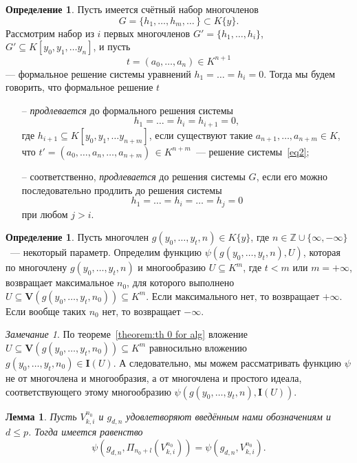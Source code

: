 \documentclass[16pt]{article}
\renewcommand{\le}{\leqslant} %
\theoremstyle{plain1}
\newtheorem{lemma}[theorem1]{Лемма}
\theoremstyle{plain2}
\theoremstyle{plain}
\theoremstyle{plain3}
\theoremstyle{definition}
\newtheorem{definition}[theorem2]{Определение}
\theoremstyle{remark}
\newtheorem{remark}[theorem1]{Замечание}
\begin{document}
\begin{definition}
Пусть имеется счётный набор многочленов
$$
G=\{h_1,\ldots,h_m,\ldots\,\}\subset K\{y\}.
$$
Рассмотрим набор из $i$ первых многочленов $G'=\{h_1,\ldots,h_i\}$, $G'\subseteq K[y_0,y_1,\ldots
y_n]$, и пусть
$$
t=(a_0,\ldots,a_n)\in K^{n+1}
$$
--- формальное решение системы уравнений $h_1=\ldots=h_i=0$. Тогда мы будем говорить, что формальное решение
$t$ 
\begin{itemize}
\item[--] \emph{продлевается} до формального решения системы
\begin{equation}\label{eq2}
h_1=\ldots=h_i=h_{i+1}=0,
\end{equation}
где $h_{i+1}\subseteq K[y_0,y_1,\ldots y_{n+m}]$,
если существуют такие $a_{n+1},\ldots, a_{n+m}\in K$, что
$t'=(a_0,\ldots,a_n,\ldots,a_{n+m})\,\in K^{n+m}$~--- решение
системы~\eqref{eq2};
\item[--] соответственно, \emph{продлевается} до решения системы $G$, если
его можно последовательно продлить до решения системы 
$$
h_1=\ldots=h_i=\ldots=h_{j}=0$$
при любом $j > i$.
\end{itemize}
\end{definition}



\begin{definition}
Пусть многочлен $g(y_0,\ldots,y_t,n)\in K\{y\}$, где $n\in \mathbb{Z}\cup\{\infty,-\infty\}$~--- некоторый параметр.
Определим функцию $\psi(g(y_0,\ldots,y_t,n),{U})$, которая по многочлену $g(y_0,\ldots,y_t,n)$ и  многообразию ${U}\subseteq K^m$, где $t< m$ или $m=+\infty$, возвращает максимальное $n_0$, для которого выполнено ${U}\subseteq \mathbf{V}(g(y_0,\ldots,y_t,n_0))\subseteq K^m$. Если максимального нет, то возвращает $+\infty$. Если вообще таких  $n_0$ нет, то возвращает $-\infty$.
\end{definition}
\begin{remark}\label{remark: zamena_mnogoobrazia_na_ideal}
По теореме~\ref{theorem:th 0 for alg} вложение ${U}\subseteq \mathbf{V}(g(y_0,\ldots,y_t,n_0))\subseteq K^m$ равносильно вложению $g(y_0,\ldots,y_t,n_0)\in \mathbf{I}(U)$. А следовательно, мы можем рассматривать функцию  $\psi$ не от многочлена и многообразия, а от многочлена и простого идеала, соответствующего этому многообразию  $\psi(g(y_0,\ldots,y_t,n),{\mathbf{I}( U)})$.
\end{remark}
\begin{lemma}\label{lemma:o_ravenste_psi}
Пусть ${V}_{k,i}^{n_0}$ и $g_{d,n}$ удовлетворяют введённым нами обозначениям и  $d\le p$. Тогда имеется равенство $$\psi(g_{d,n},\Pi_{n_0+l}({V}_{k,i}^{n_0}))=\psi(g_{d,n},{V}_{k,i}^{n_0}).$$
\end{lemma}
\end{document}
